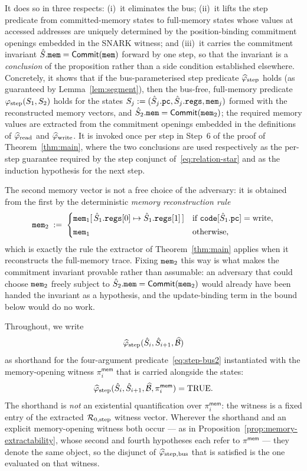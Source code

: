 It does so in three respects: (i)~it eliminates the bus; (ii)~it lifts the
step predicate from committed-memory states to full-memory states whose
values at accessed addresses are uniquely determined by the position-binding
commitment openings embedded in the SNARK witness; and (iii)~it carries the
commitment invariant $\hat{S}.\mathtt{mem}=\mathsf{Commit}(\mathtt{mem})$ forward by one step,
so that the invariant is a \emph{conclusion} of the proposition rather than a
side condition established elsewhere.  Concretely, it shows
that if the bus-parameterised step predicate $\widehat{\varphi}_{\mathrm{step}}$
holds (as guaranteed by Lemma~\ref{lem:segment}), then the bus-free,
full-memory predicate $\varphi_{\mathrm{step}}(S_1,S_2)$ holds for the states
$S_j := (\hat{S}_j.\mathtt{pc},\hat{S}_j.\mathtt{regs},\mathtt{mem}_j)$ formed with the reconstructed
memory vectors, and $\hat{S}_2.\mathtt{mem}=\mathsf{Commit}(\mathtt{mem}_2)$; the required
memory values are extracted from the commitment openings embedded in the
definitions of $\widehat{\varphi}_{\mathrm{read}}$ and $\widehat{\varphi}_{\mathrm{write}}$.
It is invoked once per step in Step~6 of the proof of
Theorem~\ref{thm:main}, where the two conclusions are used respectively as the
per-step guarantee required by the step conjunct
of~\eqref{eq:relation-star} and as the induction
hypothesis for the next step.

The second memory vector is not a free choice of the adversary: it is obtained
from the first by the deterministic \emph{memory reconstruction rule}
\begin{equation}\label{eq:mem-reconstruct}
  \mathtt{mem}_2 \;:=\;
  \begin{cases}
    \mathtt{mem}_1[\,\hat{S}_1.\mathtt{regs}[0]\mapsto\hat{S}_1.\mathtt{regs}[1]\,]
      & \text{if } \mathtt{code}[\hat{S}_1.\mathtt{pc}]=\mathrm{write},\\[2pt]
    \mathtt{mem}_1 & \text{otherwise,}
  \end{cases}
\end{equation}
which is exactly the rule the extractor of Theorem~\ref{thm:main} applies when
it reconstructs the full-memory trace.  Fixing $\mathtt{mem}_2$ this way is what makes
the commitment invariant provable rather than assumable: an adversary that
could choose $\mathtt{mem}_2$ freely subject to $\hat{S}_2.\mathtt{mem}=\mathsf{Commit}(\mathtt{mem}_2)$
would already have been handed the invariant as a hypothesis, and the
update-binding term in the bound below would do no work.

Throughout, we write
\[
  \widehat{\varphi}_{\mathrm{step}}(\hat{S}_i,\hat{S}_{i+1},\widehat{\mathcal{B}})
\]
as shorthand for the four-argument predicate~\eqref{eq:step-bus2} instantiated
with the memory-opening witness $\pi^{\mathsf{mem}}_i$ that is carried alongside
the states:
\[
  \widehat{\varphi}_{\mathrm{step}}(\hat{S}_i,\hat{S}_{i+1},\widehat{\mathcal{B}},\pi^{\mathsf{mem}}_i)=\mathrm{TRUE}.
\]
The shorthand is \emph{not} an existential quantification over
$\pi^{\mathsf{mem}}_i$: the witness is a fixed entry of the extracted
$\mathcal{R}_{0,\mathrm{step}}$ witness vector.  Wherever the shorthand and an explicit
memory-opening witness both occur --- as in
Proposition~\ref{prop:memory-extractability}, whose second and fourth
hypotheses each refer to $\pi^{\mathsf{mem}}$ --- they denote the same object,
so the disjunct of $\widehat{\varphi}_{\mathrm{step},\mathrm{bus}}$ that is satisfied is the one
evaluated on that witness.

